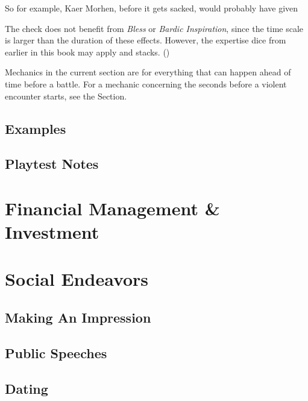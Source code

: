 \documentclass[twocolumn]{dndbook}
\begin{document}
So for example, Kaer Morhen, before it gets sacked, would probably have given \par

The check does not benefit from \emph{Bless} or \emph{Bardic Inspiration}, since the time scale is larger than the duration of these effects.
However, the expertise dice from earlier in this book may apply and stacks. ()\par


\begin{emphasisParagraph}
	Mechanics in the current section are for everything that can happen ahead of time before a battle.
	For a mechanic concerning the seconds before a violent encounter starts, see the  Section.\par
\end{emphasisParagraph}

\subsection{Examples}

\subsection{Playtest Notes}



\section{Financial Management \& Investment}


\section{Social Endeavors}
\subsection{Making An Impression}
\subsection{Public Speeches}
\subsection{Dating}
\end{document}
